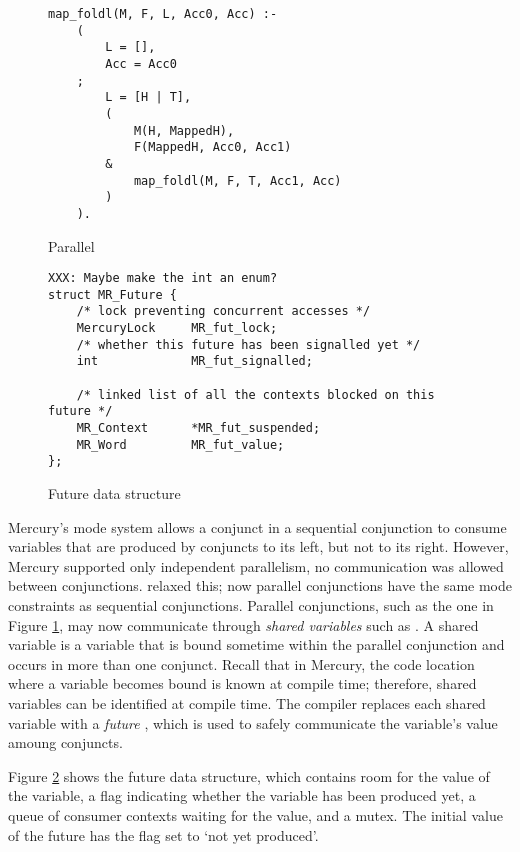 

\begin{figure}
\begin{verbatim}
map_foldl(M, F, L, Acc0, Acc) :-
    (
        L = [],
        Acc = Acc0
    ;
        L = [H | T],
        (
            M(H, MappedH),
            F(MappedH, Acc0, Acc1)
        &
            map_foldl(M, F, T, Acc1, Acc)
        )
    ).
\end{verbatim}
\caption{Parallel \mapfoldl{}}
\label{fig:mapfoldl}
\end{figure}

\begin{figure}
\begin{verbatim}
XXX: Maybe make the int an enum?
struct MR_Future {
    /* lock preventing concurrent accesses */
    MercuryLock     MR_fut_lock;
    /* whether this future has been signalled yet */
    int             MR_fut_signalled;

    /* linked list of all the contexts blocked on this future */
    MR_Context      *MR_fut_suspended;
    MR_Word         MR_fut_value;
};
\end{verbatim}
\caption{Future data structure}
\label{fig:future}
\end{figure}

Mercury's mode system allows a conjunct in a sequential conjunction to consume
variables that are produced by conjuncts to its left, but not to its right.
However, Mercury supported only independent parallelism,
no communication was allowed between conjunctions.
\citet{wang_dep_par_conj,wang_hons_thesis} relaxed this;
now parallel conjunctions have the same mode constraints as sequential
conjunctions.
Parallel conjunctions,
such as the one in Figure \ref{fig:mapfoldl},
may now
communicate through \emph{shared variables} such as .
A shared variable is a variable that is bound sometime within the parallel
conjunction and occurs in more than one conjunct.
Recall that in Mercury,
the code location where a variable becomes bound is known
at compile time;
therefore,
shared variables can be identified at compile time.
The compiler replaces each shared variable with a \emph{future}
\citep{halstead:1984:multilisp},
which is used to safely communicate the variable's value amoung conjuncts.

Figure \ref{fig:future} shows the future data structure,
which contains room for the value of the variable,
a flag indicating whether the variable has been produced yet,
a queue of consumer contexts waiting for the value, and a mutex.
The initial value of the future has the flag set to `not yet produced'.

